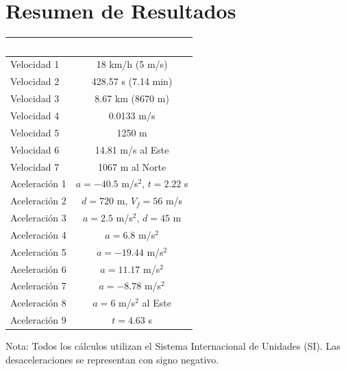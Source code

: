 \documentclass[10pt,a4paper]{article}
\begin{document}
\section{Resumen de Resultados}
\begin{tabularx}{\textwidth}{LC}
  \toprule{}
  \textbf{\textcolor{white}{Ejercicio}} & \textbf{\textcolor{white}{Resultado Principal}} \\
  \midrule
  Velocidad 1 & 18 km/h (5 m/s) \\
  Velocidad 2 & 428.57 s (7.14 min) \\
  Velocidad 3 & 8.67 km (8670 m) \\
  Velocidad 4 & 0.0133 m/s \\
  Velocidad 5 & 1250 m \\
  Velocidad 6 & 14.81 m/s al Este \\
  Velocidad 7 & 1067 m al Norte \\
  Aceleración 1 & $a = -40.5$ m/s$^2$, $t = 2.22$ s \\
  Aceleración 2 & $d = 720$ m, $V_f = 56$ m/s \\
  Aceleración 3 & $a = 2.5$ m/s$^2$, $d = 45$ m \\
  Aceleración 4 & $a = 6.8$ m/s$^2$ \\
  Aceleración 5 & $a = -19.44$ m/s$^2$ \\
  Aceleración 6 & $a = 11.17$ m/s$^2$ \\
  Aceleración 7 & $a = -8.78$ m/s$^2$ \\
  Aceleración 8 & $a = 6$ m/s$^2$ al Este \\
  Aceleración 9 & $t = 4.63$ s \\
  \bottomrule
\end{tabularx}
\vspace{8pt}
\begin{tcolorbox}[colback=grisclr, colframe=gris, arc=4pt, boxrule=0.3pt,
  left=8pt, right=8pt, top=4pt, bottom=4pt, width=\textwidth]
  \small\textcolor{gris}{Nota: Todos los cálculos utilizan el Sistema Internacional de Unidades (SI).}
  \small\textcolor{gris}{Las desaceleraciones se representan con signo negativo.}
\end{tcolorbox}
\end{document}
